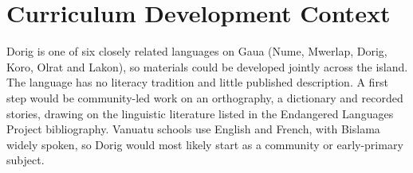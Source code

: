 \documentclass[12pt]{article}
\begin{document}
\section{Curriculum Development Context}
Dorig is one of six closely related languages on Gaua (Nume, Mwerlap, Dorig, Koro, Olrat and Lakon), so materials could be developed jointly across the island. The language has no literacy tradition and little published description. A first step would be community-led work on an orthography, a dictionary and recorded stories, drawing on the linguistic literature listed in the Endangered Languages Project bibliography. Vanuatu schools use English and French, with Bislama widely spoken, so Dorig would most likely start as a community or early-primary subject.
\end{document}
